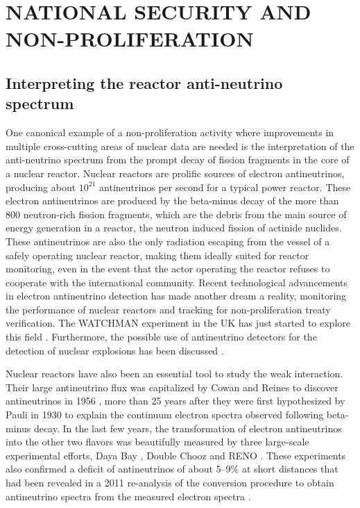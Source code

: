 \documentclass[letterpaper]{ar-1col}
\begin{document}
\section{NATIONAL SECURITY AND NON-PROLIFERATION}



\subsection{Interpreting the reactor anti-neutrino spectrum}

One canonical example of a non-proliferation activity where improvements in multiple cross-cutting areas of nuclear data are needed is the interpretation of the anti-neutrino spectrum from the prompt decay of fission fragments in the core of a nuclear reactor. Nuclear reactors are prolific sources of electron antineutrinos, producing about $10^{21}$ antineutrinos per second for a typical power reactor.  These electron antineutrinos are produced by the beta-minus decay of the more than 800 neutron-rich fission fragments, which are the debris from the main source of energy generation in a reactor, the neutron induced fission of actinide nuclides.  These antineutrinos are also the only radiation escaping from the vessel of a safely operating nuclear reactor, making them ideally suited for reactor monitoring, even in the event that the actor operating the reactor refuses to cooperate with the international community.  Recent technological advancements in electron antineutrino detection has made another dream a reality, monitoring the performance of nuclear reactors and tracking  for non-proliferation treaty verification.   The WATCHMAN experiment in the UK has just started to explore this field \cite{Cha18}.  Furthermore, the possible use of antineutrino detectors for the detection of nuclear explosions has been discussed \cite{CarAx}.
 
Nuclear reactors have also been an essential tool to study the weak interaction.  Their large antineutrino flux was capitalized by Cowan and Reines to discover antineutrinos in 1956 \cite{Cow56}, more than 25 years after they were first hypothesized by Pauli in 1930 to explain the continuum electron spectra observed following beta-minus decay.   In the last few years, the transformation of electron antineutrinos into the other two flavors was beautifully measured by three large-scale experimental efforts, Daya Bay \cite{An16}, Double Chooz \cite{Abe12} and RENO \cite{Cho16}.   These experiments also confirmed a deficit of antineutrinos of about 5--9\% at short distances that had been revealed in a 2011 re-analysis of the conversion procedure to obtain antineutrino spectra from the measured electron spectra \cite{Men11}.
\end{document}
